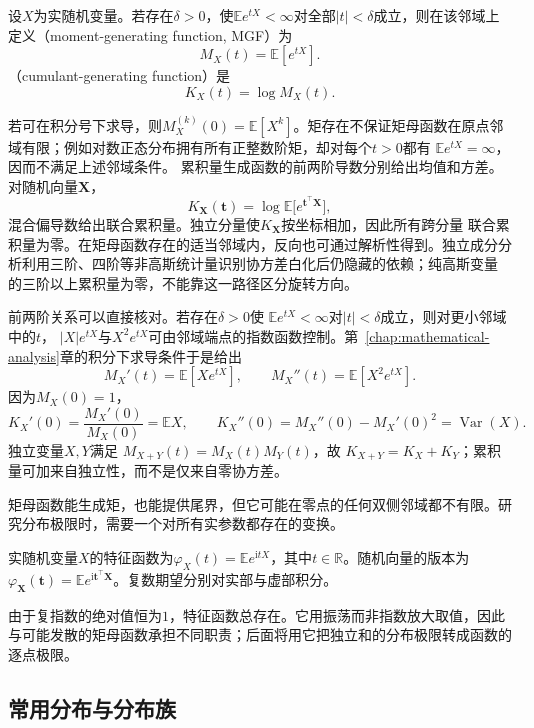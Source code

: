 \begin{definition}[矩母函数与累积量生成函数]
  \label{def:probability-moment-generating-functions}
设\(X\)为实随机变量。若存在\(\delta>0\)，使\(\mathbb E e^{tX}<\infty\)对全部\(|t|<\delta\)成立，则在该邻域上定义（moment-generating function, MGF）为
\[ M_X(t)=\mathbb{E}[e^{tX}]. \]
（cumulant-generating function）是
\[ K_X(t)=\log M_X(t). \]
\end{definition}
若可在积分号下求导，则\(M_X^{(k)}(0)=\mathbb{E}[X^k]\)。矩存在不保证矩母函数在原点邻域有限；例如对数正态分布拥有所有正整数阶矩，却对每个\(t>0\)都有
\(\mathbb E e^{tX}=\infty\)，因而不满足上述邻域条件。
累积量生成函数的前两阶导数分别给出均值和方差。对随机向量\(\bm{X}\)，
\[ K_{\bm{X}}(\bm{t})
  =\log\mathbb{E}\bigl[e^{\bm{t}^{\top}\bm{X}}\bigr], \]
混合偏导数给出联合累积量。独立分量使\(K_{\bm{X}}\)按坐标相加，因此所有跨分量
联合累积量为零。在矩母函数存在的适当邻域内，反向也可通过解析性得到。独立成分分析利用三阶、四阶等非高斯统计量识别协方差白化后仍隐藏的依赖；纯高斯变量
的三阶以上累积量为零，不能靠这一路径区分旋转方向。

前两阶关系可以直接核对。若存在\(\delta>0\)使
\(\mathbb{E}e^{tX}<\infty\)对\(|t|<\delta\)成立，则对更小邻域中的\(t\)，
\(|X|e^{tX}\)与\(X^2e^{tX}\)可由邻域端点的指数函数控制。第~\ref{chap:mathematical-analysis}章的积分下求导条件于是给出
\[
  M_X'(t)=\mathbb{E}[Xe^{tX}],\qquad
  M_X''(t)=\mathbb{E}[X^2e^{tX}].
\]
因为\(M_X(0)=1\)，
\[
  K_X'(0)=\frac{M_X'(0)}{M_X(0)}=\mathbb{E}X,
  \qquad
  K_X''(0)
  =M_X''(0)-M_X'(0)^2
  =\operatorname{Var}(X).
\]
独立变量\(X,Y\)满足
\(M_{X+Y}(t)=M_X(t)M_Y(t)\)，故
\(K_{X+Y}=K_X+K_Y\)；累积量可加来自独立性，而不是仅来自零协方差。

矩母函数能生成矩，也能提供尾界，但它可能在零点的任何双侧邻域都不有限。研究分布极限时，需要一个对所有实参数都存在的变换。
\begin{definition}[特征函数]
  \label{def:probability-characteristic-function}
实随机变量\(X\)的特征函数为\(\varphi_X(t)=\mathbb E e^{\mathrm i tX}\)，其中\(t\in\mathbb R\)。随机向量的版本为\(\varphi_{\bm X}(\bm t)=\mathbb E e^{\mathrm i\bm t^\top\bm X}\)。复数期望分别对实部与虚部积分。
\end{definition}
由于复指数的绝对值恒为\(1\)，特征函数总存在。它用振荡而非指数放大取值，因此与可能发散的矩母函数承担不同职责；后面将用它把独立和的分布极限转成函数的逐点极限。

\subsection{常用分布与分布族}
\label{sec:probability-common-distributions}

